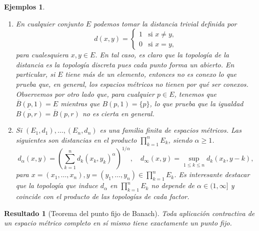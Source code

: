 \documentclass[a4paper,10pt]{article}
\theoremstyle{teorema}
\theoremstyle{plano}
\newtheorem{ejems}[teor]{Ejemplos}
\theoremstyle{titulo}
\newtheorem{resu}[teor]{Resultado}
\begin{document}
\begin{ejems} ~

\begin{enumerate}
 \item En cualquier conjunto $E$ podemos tomar la distancia trivial definida por 
 \[d(x,y)=\begin{cases}
  	1&\text{si } x\neq y,\\
  	0&\text{si } x=y,
 \end{cases}\]
 para cualesquiera $x,y\in E$. En tal caso, es claro que la topología de la distancia es la topología discreta pues cada punto forma un abierto. En particular, si $E$ tiene más de un elemento, entonces no es conexo lo que prueba que, en general, los espacios métricos no tienen por qué ser conexos. Observemos por otro lado que, para cualquier $p\in E$, tenemos que $\overline B(p,1)=E$ mientras que $B(p,1)=\{p\}$, lo que prueba que la igualdad $\overline{B(p,r)}=\overline B(p,r)$ no es cierta en general.
 \item Si $(E_1,d_1),\ldots,(E_n,d_n)$ es una familia finita de espacios métricos. Las siguientes son distancias en el producto $\prod_{k=1}^nE_k$, siendo $\alpha\geq 1$.
	\[
	d_\alpha(x,y)=\left(\sum_{k=1}^nd_k(x_k,y_k)^\alpha\right)^{1/\alpha}, \quad d_\infty(x,y)=\sup_{1\leq k\leq n}d_k(x_k,y-k),\]
para $x=(x_1,\ldots,x_n),y=(y_1,\ldots,y_n)\in \prod_{k=1}^nE_k$. Es interesante destacar que la topología que induce $d_\alpha$ en $\prod_{k=1}^nE_k$ no depende de $\alpha\in(1,\infty]$ y coincide con el producto de las topologías de cada factor.
\end{enumerate}
\end{ejems}

\begin{resu}[Teorema del punto fijo de Banach] \label{thm:fixed-point}
Toda aplicación contractiva de un espacio métrico completo en sí mismo
tiene exactamente un punto fijo.
\end{resu}
\end{document}
